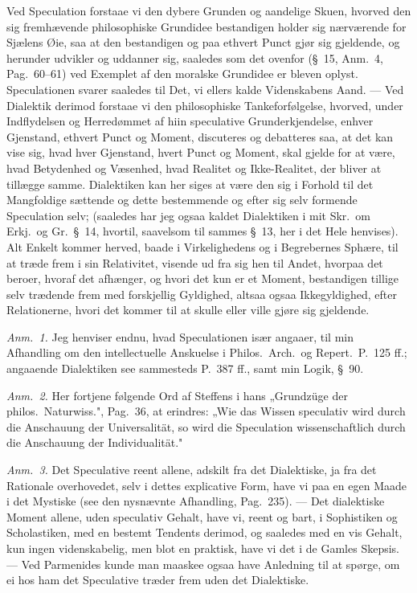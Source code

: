 \documentclass[12pt,a4paper]{book}
\newcommand{\apage}[1]{\marginnote{\footnotesize\textit{[#1]}}}
\begin{document}
Ved Speculation forstaae vi den dybere Grunden og aandelige Skuen, hvorved den sig
fremhævende philosophiske Grundidee bestandigen holder sig nærværende for Sjælens
Øie, saa at den bestandigen og paa ethvert Punct gjør sig gjeldende, og herunder
udvikler og uddanner sig, saaledes som det ovenfor (\S~15, Anm.~4, Pag.\ 60--61) ved
Exemplet af den moralske Grundidee er bleven oplyst. Speculationen svarer saaledes
til Det, vi ellers kalde Videnskabens Aand. --- Ved Dialektik derimod forstaae vi den
philosophiske Tankeforfølgelse, hvorved, under Indflydelsen og Herredømmet af hiin
speculative Grunderkjendelse, enhver Gjenstand, ethvert Punct og Moment, discuteres
og debatteres saa, at det kan vise sig, hvad hver Gjenstand, hvert Punct og Moment,
skal gjelde for at være, hvad Betydenhed og Væsenhed, hvad Realitet og Ikke-Realitet,
der bliver at tillægge samme. Dialektiken kan her siges at være den sig i Forhold til
det Mangfoldige sættende og dette bestemmende og efter sig selv formende Speculation
selv; (saaledes har jeg ogsaa kaldet Dialektiken i mit Skr.\ om Erkj.\ og Gr.\ \S~14,
hvortil, saavelsom til sammes \S~13, her i det Hele henvises). Alt Enkelt kommer
herved, baade i Virkelighedens og i Begrebernes Sphære, til at træde frem i sin
Relativitet, visende ud fra sig hen til Andet, hvorpaa det beroer, hvoraf det
afhænger, og hvori det kun er et Moment, bestandigen tillige selv trædende frem med
forskjellig Gyldighed, altsaa ogsaa Ikkegyldighed, efter Relationerne, hvori det
kommer til at skulle eller ville gjøre sig gjeldende.

{\small\emph{Anm.~1.} Jeg henviser endnu, hvad Speculationen især angaaer, til min
Afhandling om den intellectuelle Anskuelse i Philos.\ Arch.\ og Repert.\ P.\ 125 ff.;
angaaende Dialektiken see sammesteds P.\ 387 ff., samt min Logik, \S~90.\par} \apage{69} 

{\small\emph{Anm.~2.} Her fortjene følgende Ord af Steffens i hans „Grundzüge der
philos.\ Naturwiss.", Pag.\ 36, at erindres: „Wie das Wissen speculativ wird durch
die Anschauung der Universalität, so wird die Speculation wissenschaftlich durch die
Anschauung der Individualität."\par}

{\small\emph{Anm.~3.} Det Speculative reent allene, adskilt fra det Dialektiske, ja
fra det Rationale overhovedet, selv i dettes explicative Form, have vi paa en egen
Maade i det Mystiske (see den nysnævnte Afhandling, Pag.\ 235). --- Det dialektiske
Moment allene, uden speculativ Gehalt, have vi, reent og bart, i Sophistiken og
Scholastiken, med en bestemt Tendents derimod, og saaledes med en vis Gehalt, kun
ingen videnskabelig, men blot en praktisk, have vi det i de Gamles Skepsis. --- Ved
Parmenides kunde man maaskee ogsaa have Anledning til at spørge, om ei hos ham det
Speculative træder frem uden det Dialektiske.\par}
\end{document}
